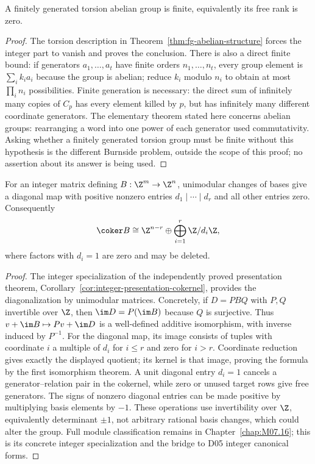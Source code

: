 \begin{corollary}\label{cor:fg-torsion-finite}
A finitely generated torsion abelian group is finite, equivalently its free rank is zero.
\end{corollary}
\begin{proof}
The torsion description in Theorem~\ref{thm:fg-abelian-structure} forces the integer part to vanish and proves the conclusion. There is also a direct finite bound: if generators $a_1,\ldots,a_t$ have finite orders $n_1,\ldots,n_t$, every group element is $\sum_i k_i a_i$ because the group is abelian; reduce $k_i$ modulo $n_i$ to obtain at most $\prod_i n_i$ possibilities. Finite generation is necessary: the direct sum of infinitely many copies of $C_p$ has every element killed by $p$, but has infinitely many different coordinate generators. The elementary theorem stated here concerns abelian groups: rearranging a word into one power of each generator used commutativity. Asking whether a finitely generated torsion group must be finite without this hypothesis is the different Burnside problem, outside the scope of this proof; no assertion about its answer is being used.
\end{proof}

\begin{theorem}\label{thm:integer-abelian-presentation}
For an integer matrix defining $B:\Z^m\to\Z^n$, unimodular changes of bases give a diagonal map with positive nonzero entries $d_1\mid\cdots\mid d_r$ and all other entries zero. Consequently
\[
 \coker B\cong\Z^{n-r}\oplus\bigoplus_{i=1}^r\Z/d_i\Z,
\]
where factors with $d_i=1$ are zero and may be deleted.
\end{theorem}
\begin{proof}
The integer specialization of the independently proved presentation theorem, Corollary~\ref{cor:integer-presentation-cokernel}, provides the diagonalization by unimodular matrices. Concretely, if $D=PBQ$ with $P,Q$ invertible over $\Z$, then $\im D=P(\im B)$ because $Q$ is surjective. Thus $v+\im B\mapsto Pv+\im D$ is a well-defined additive isomorphism, with inverse induced by $P^{-1}$. For the diagonal map, its image consists of tuples with coordinate $i$ a multiple of $d_i$ for $i\leq r$ and zero for $i>r$. Coordinate reduction gives exactly the displayed quotient; its kernel is that image, proving the formula by the first isomorphism theorem. A unit diagonal entry $d_i=1$ cancels a generator--relation pair in the cokernel, while zero or unused target rows give free generators. The signs of nonzero diagonal entries can be made positive by multiplying basis elements by $-1$. These operations use invertibility over $\Z$, equivalently determinant $\pm1$, not arbitrary rational basis changes, which could alter the group. Full module classification remains in Chapter~\ref{chap:M07.16}; this is its concrete integer specialization and the bridge to D05 integer canonical forms.
\end{proof}
